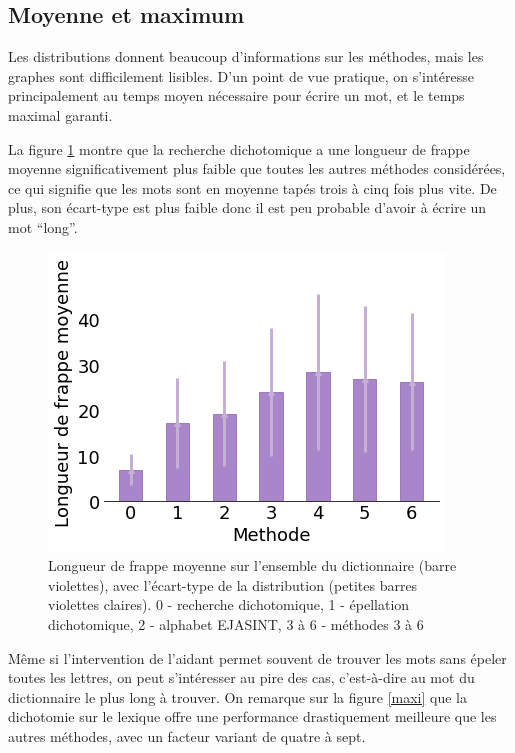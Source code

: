 \documentclass[twoside,twocolumn]{article}
\begin{document}
\subsection{Moyenne et maximum}

Les distributions donnent beaucoup d'informations sur les méthodes, mais les graphes sont difficilement lisibles. D'un point de vue pratique, on s'intéresse principalement au temps moyen nécessaire pour écrire un mot, et le temps maximal garanti.

La figure \ref{mean} montre que la recherche dichotomique a une longueur de frappe moyenne significativement plus faible que toutes les autres méthodes considérées, ce qui signifie que les mots sont en moyenne tapés trois à cinq fois plus vite. De plus, son écart-type est plus faible donc il est peu probable d'avoir à écrire un mot ``long''.

\begin{center}
\begin{figure}
  \includegraphics[scale=0.5]{mean.png}
  \caption{Longueur de frappe moyenne sur l'ensemble du dictionnaire (barre violettes), avec l'écart-type de la distribution (petites barres violettes claires). 0 - recherche dichotomique, 1 - épellation dichotomique, 2 - alphabet EJASINT, 3 à 6 - méthodes 3 à 6}
  \label{mean}
\end{figure}
\end{center}

Même si l'intervention de l'aidant permet souvent de trouver les mots sans épeler toutes les lettres, on peut s'intéresser au pire des cas, c'est-à-dire au mot du dictionnaire le plus long à trouver. On remarque sur la figure \ref{maxi} que la dichotomie sur le lexique offre une performance drastiquement meilleure que les autres méthodes, avec un facteur variant de quatre à sept.
\end{document}
